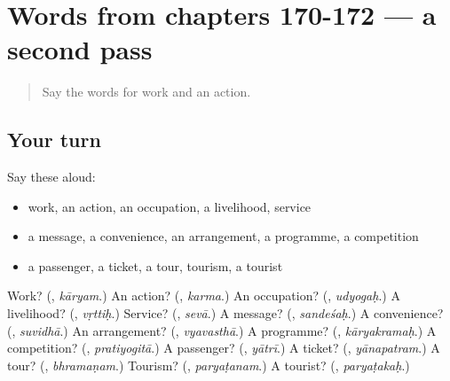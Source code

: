 \section[(dialogue)]{Words from chapters 170-172 — a second pass}

\label{lesson:SA-R172-second-pass-words-from-chapters-170-172}



\begin{quote}
Say the words for work and an action.
\end{quote}

\subsection*{Your turn}
Say these aloud:

\begin{itemize}
\raggedright
  \item work, an action, an occupation, a livelihood, service
  \item a message, a convenience, an arrangement, a programme, a competition
  \item a passenger, a ticket, a tour, tourism, a tourist
\end{itemize}

\begin{tcolorbox}[breakable,colback=teal!4,colframe=teal!35!black,title={Before you move on}]
Work? (\textbf{}, \emph{kāryam}.) An action? (\textbf{}, \emph{karma}.) An occupation? (\textbf{}, \emph{udyogaḥ}.) A livelihood? (\textbf{}, \emph{vṛttiḥ}.) Service? (\textbf{}, \emph{sevā}.) A message? (\textbf{}, \emph{sandeśaḥ}.) A convenience? (\textbf{}, \emph{suvidhā}.) An arrangement? (\textbf{}, \emph{vyavasthā}.) A programme? (\textbf{}, \emph{kāryakramaḥ}.) A competition? (\textbf{}, \emph{pratiyogitā}.) A passenger? (\textbf{}, \emph{yātrī}.) A ticket? (\textbf{}, \emph{yānapatram}.) A tour? (\textbf{}, \emph{bhramaṇam}.) Tourism? (\textbf{}, \emph{paryaṭanam}.) A tourist? (\textbf{}, \emph{paryaṭakaḥ}.)
\end{tcolorbox}
